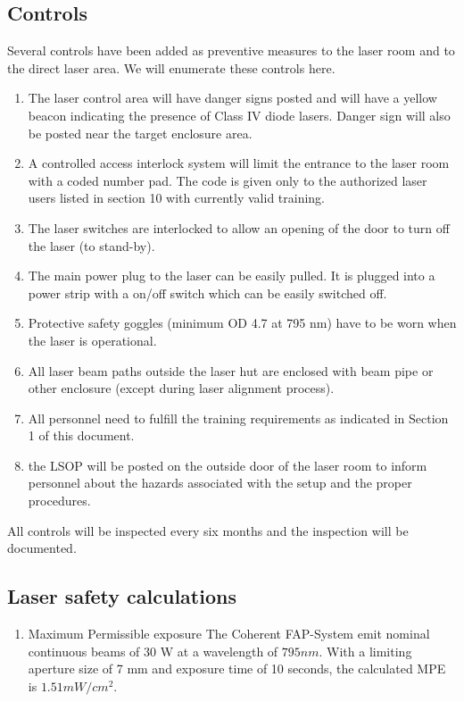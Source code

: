 {\subsection{Controls}

Several controls have been added as preventive measures to the laser room 
and to the direct laser area. We will enumerate these controls here.
\begin {enumerate}
\item The laser control area will have danger signs posted and will have a
yellow beacon indicating the presence of Class IV diode lasers. Danger
sign will also be posted near the target enclosure area.
\item A controlled access interlock system will limit the entrance to
the laser room with a coded number pad. The code is given only to the
authorized laser users listed in section 10 with currently valid
training.
\item The laser switches are interlocked to allow an opening of the
door to turn off the laser (to stand-by).
\item The main power plug to the laser can be easily pulled. It is
plugged into a power strip with a on/off switch which can be easily
switched off.
\item Protective safety goggles (minimum OD 4.7 at 795 nm) have to be
worn when the laser is operational.
\item All laser beam paths outside the laser hut are enclosed with
beam pipe or other enclosure (except during laser alignment process).
\item All personnel need to fulfill the training requirements as
indicated in Section 1 of this document.
\item the LSOP will be posted on the outside door of the laser room to
inform personnel about the hazards associated with the setup and the
proper procedures.
\end {enumerate}

All controls will be inspected every six months
and the inspection will be documented.

\subsection{Laser safety calculations}

\begin {enumerate}
\item {Maximum Permissible exposure}
The Coherent FAP-System
 emit nominal 
continuous beams of 30 W at a wavelength of $795 nm$.
With a limiting aperture size of 7 mm and exposure time of 10 seconds,
the calculated MPE is $1.51 mW/cm^2$.


\end{enumerate}}
